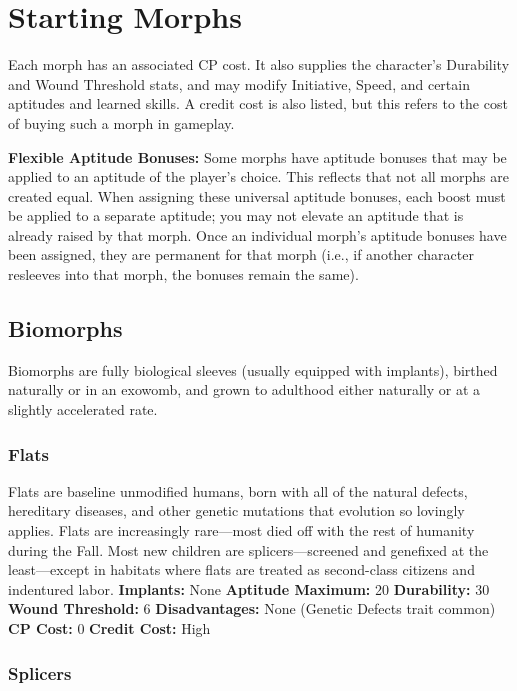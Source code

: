 \section{Starting Morphs}

Each morph has an associated CP cost. It also supplies
the character's Durability and Wound Threshold
stats, and may modify Initiative, Speed, and certain 
aptitudes and learned skills. A credit cost is also listed, 
but this refers to the cost of buying such a morph in 
gameplay.

\textbf{Flexible Aptitude Bonuses:} Some morphs have aptitude
bonuses that may be applied to an aptitude of
the player's choice. This reflects that not all morphs 
are created equal. When assigning these universal aptitude
bonuses, each boost must be applied to a separate
aptitude; you may not elevate an aptitude that
is already raised by that morph. Once an individual 
morph's aptitude bonuses have been assigned, they 
are permanent for that morph (i.e., if another character
resleeves into that morph, the bonuses remain
the same).

\subsection{Biomorphs}

Biomorphs are fully biological sleeves (usually 
equipped with implants), birthed naturally or in an 
exowomb, and grown to adulthood either naturally 
or at a slightly accelerated rate.

\subsubsection{Flats}

Flats are baseline unmodified humans, born with all 
of the natural defects, hereditary diseases, and other 
genetic mutations that evolution so lovingly applies. 
Flats are increasingly rare—most died off with the rest 
of humanity during the Fall. Most new children are 
splicers—screened and genefixed at the least—except 
in habitats where flats are treated as second-class citizens
and indentured labor.
\textbf{Implants: }None
\textbf{Aptitude Maximum: }20
\textbf{Durability:} 30
\textbf{Wound Threshold:} 6
\textbf{Disadvantages: }None (Genetic Defects trait common)
\textbf{CP Cost: }0
\textbf{Credit Cost: }High

\subsubsection{Splicers}

